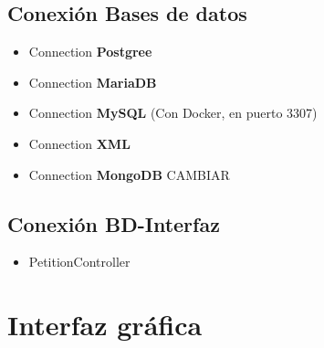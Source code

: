 \documentclass[12pt,a4paper]{article}
\begin{document}
\subsection{Conexión Bases de datos} \label{pto61}

\begin{itemize}

\item Connection \textbf{Postgree} \label{pto611}

 
 \item Connection \textbf{MariaDB} \label{pto612}


\item Connection \textbf{MySQL} (Con Docker, en puerto 3307) \label{pto613}


\item Connection \textbf{XML} \label{pto614}


\item Connection \textbf{MongoDB} CAMBIAR \label{pto615}

\end{itemize}
\subsection{Conexión BD-Interfaz} \label{pto62}
\begin{itemize}
\item PetitionController \label{pto621}

\end{itemize}







\newpage
\mbox{}
\newpage

\section{Interfaz gráfica} \label{pto7}
\end{document}
